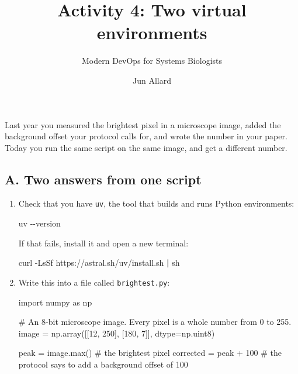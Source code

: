 \documentclass[
  letterpaper,
  DIV=11,
  numbers=noendperiod]{scrartcl}
\title{Activity 4: Two virtual environments}
\subtitle{Modern DevOps for Systems Biologists}
\author{Jun Allard}
\date{}
\newenvironment{Shaded}{\begin{snugshade}}{\end{snugshade}}
\newcommand{\AttributeTok}[1]{\textcolor[rgb]{0.40,0.45,0.13}{#1}}
\newcommand{\BuiltInTok}[1]{\textcolor[rgb]{0.00,0.23,0.31}{#1}}
\newcommand{\CommentTok}[1]{\textcolor[rgb]{0.37,0.37,0.37}{#1}}
\newcommand{\DecValTok}[1]{\textcolor[rgb]{0.68,0.00,0.00}{#1}}
\newcommand{\ExtensionTok}[1]{\textcolor[rgb]{0.00,0.23,0.31}{#1}}
\newcommand{\FunctionTok}[1]{\textcolor[rgb]{0.28,0.35,0.67}{#1}}
\newcommand{\ImportTok}[1]{\textcolor[rgb]{0.00,0.46,0.62}{#1}}
\newcommand{\KeywordTok}[1]{\textcolor[rgb]{0.00,0.23,0.31}{\textbf{#1}}}
\newcommand{\NormalTok}[1]{\textcolor[rgb]{0.00,0.23,0.31}{#1}}
\newcommand{\OperatorTok}[1]{\textcolor[rgb]{0.37,0.37,0.37}{#1}}
\begin{document}
\maketitle


Last year you measured the brightest pixel in a microscope image, added
the background offset your protocol calls for, and wrote the number in
your paper. Today you run the same script on the same image, and get a
different number.

\subsection{A. Two answers from one
script}\label{a.-two-answers-from-one-script}

\begin{enumerate}
\def\labelenumi{\roman{enumi}.}
\item
  Check that you have \texttt{uv}, the tool that builds and runs Python
  environments:

\begin{Shaded}
\begin{Highlighting}[]
\ExtensionTok{uv} \AttributeTok{{-}{-}version}
\end{Highlighting}
\end{Shaded}

  If that fails, install it and open a new terminal:

\begin{Shaded}
\begin{Highlighting}[]
\ExtensionTok{curl} \AttributeTok{{-}LsSf}\NormalTok{ https://astral.sh/uv/install.sh }\KeywordTok{|} \FunctionTok{sh}
\end{Highlighting}
\end{Shaded}
\item
  Write this into a file called \texttt{brightest.py}:

\begin{Shaded}
\begin{Highlighting}[]
\ImportTok{import}\NormalTok{ numpy }\ImportTok{as}\NormalTok{ np}

\CommentTok{\# An 8{-}bit microscope image. Every pixel is a whole number from 0 to 255.}
\NormalTok{image }\OperatorTok{=}\NormalTok{ np.array([[}\DecValTok{12}\NormalTok{, }\DecValTok{250}\NormalTok{], [}\DecValTok{180}\NormalTok{, }\DecValTok{7}\NormalTok{]], dtype}\OperatorTok{=}\NormalTok{np.uint8)}

\NormalTok{peak }\OperatorTok{=}\NormalTok{ image.}\BuiltInTok{max}\NormalTok{()      }\CommentTok{\# the brightest pixel}
\NormalTok{corrected }\OperatorTok{=}\NormalTok{ peak }\OperatorTok{+} \DecValTok{100}  \CommentTok{\# the protocol says to add a background offset of 100}


\end{Highlighting}
\end{Shaded}
\end{enumerate}
\end{document}
